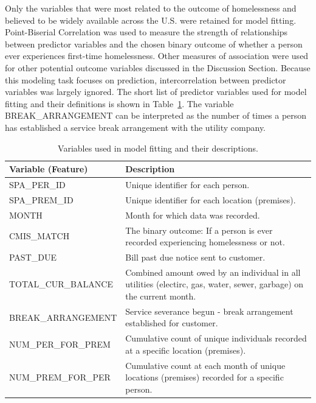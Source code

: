 \documentclass[10pt,letterpaper]{article}
\begin{document}
Only the variables that were most related to the outcome of homelessness and believed to be widely available across the U.S. were retained for model fitting. Point-Biserial Correlation was used to measure the strength of relationships between predictor variables and the chosen binary outcome of whether a person ever experiences first-time homelessness. Other measures of association were used for other potential outcome variables discussed in the Discussion Section. Because this modeling task focuses on prediction, intercorrelation between predictor variables was largely ignored. The short list of predictor variables used for model fitting and their definitions is shown in Table~\ref{tbl:varsUsed}. The variable BREAK\_ARRANGEMENT can be interpreted as the number of times a person has established a service break arrangement with the utility company.

\begin{table}[!h]
    \centering
    \begin{tabular}{m{4.5cm} | m{7cm}}
        \toprule
        Variable (Feature) &                  Description \\
        \hline \hline
        SPA\_PER\_ID & Unique identifier for each person. \\
        \midrule
        SPA\_PREM\_ID & Unique identifier for each location (premises). \\
        \midrule
        MONTH & Month for which data was recorded. \\
        \midrule
        CMIS\_MATCH & The binary outcome: If a person is ever recorded experiencing homelessness or not. \\
        \midrule
        PAST\_DUE & Bill past due notice sent to customer. \\
        \midrule
        TOTAL\_CUR\_BALANCE & Combined amount owed by an individual in all utilities (electirc, gas, water, sewer, garbage) on the current month. \\
        \midrule
        BREAK\_ARRANGEMENT & Service severance begun - break arrangement established for customer. \\
        \midrule
        NUM\_PER\_FOR\_PREM & Cumulative count of unique individuals recorded at a specific location (premises). \\
        \midrule
        NUM\_PREM\_FOR\_PER & Cumulative count at each month of unique locations (premises) recorded for a specific person. \\
        \bottomrule
    \end{tabular}
    \caption[Variables Used]{Variables used in model fitting and their descriptions.}
    \label{tbl:varsUsed}
\end{table}
\end{document}
